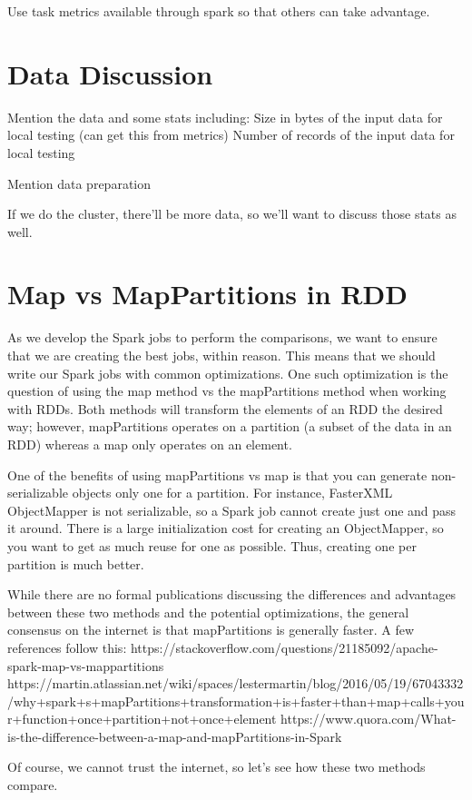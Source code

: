 \documentclass[conference]{IEEEtran}
\begin{document}
Use task metrics available through spark so that others can take advantage.

\section{Data Discussion}
Mention the data and some stats including:
Size in bytes of the input data for local testing (can get this from metrics)
Number of records of the input data for local testing

Mention data preparation

If we do the cluster, there'll be more data, so we'll want to discuss those stats as well.

\section{Map vs MapPartitions in RDD}
As we develop the Spark jobs to perform the comparisons, we want to ensure that we are creating the best jobs, within
reason. This means that we should write our Spark jobs with common optimizations.  One such optimization is the
question of using the map method vs the mapPartitions method when working with RDDs.  Both methods will transform
the elements of an RDD the desired way; however, mapPartitions operates on a partition (a subset of the data in an RDD)
whereas a map only operates on an element.

One of the benefits of using mapPartitions vs map is that you can generate non-serializable objects only one for a partition.
For instance, FasterXML ObjectMapper is not serializable, so a Spark job cannot create just one and pass it around.
There is a large initialization cost for creating an ObjectMapper, so you want to get as much reuse for one as possible.
Thus, creating one per partition is much better.

While there are no formal publications discussing the differences and advantages between
these two methods and the potential optimizations, the general consensus on the internet is that mapPartitions is
generally faster.  A few references follow this:
https://stackoverflow.com/questions/21185092/apache-spark-map-vs-mappartitions
https://martin.atlassian.net/wiki/spaces/lestermartin/blog/2016/05/19/67043332/why+spark+s+mapPartitions+transformation+is+faster+than+map+calls+your+function+once+partition+not+once+element
https://www.quora.com/What-is-the-difference-between-a-map-and-mapPartitions-in-Spark

Of course, we cannot trust the internet, so let's see how these two methods compare.
\end{document}
